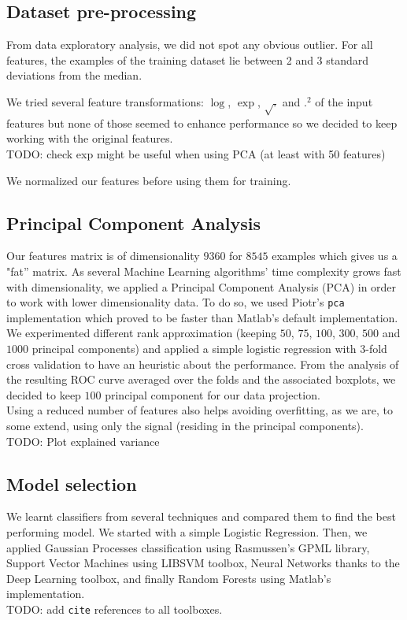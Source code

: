 \documentclass{article}
\begin{document}
  \subsection{Dataset pre-processing}
  From data exploratory analysis, we did not spot any obvious outlier. For all features, the examples of the training dataset lie between 2 and 3 standard deviations from the median.

  We tried several feature transformations: $\log$, $\exp$, $\sqrt{.}$ and $.^2$ of the input features but none of those seemed to enhance performance so we decided to keep working with the original features.\\
  TODO: check exp might be useful when using PCA (at least with 50 features)

  We normalized our features before using them for training.

  \subsection{Principal Component Analysis}
  Our features matrix is of dimensionality $9360$ for $8545$ examples which gives us a "fat'' matrix. As several Machine Learning algorithms' time complexity grows fast with dimensionality, we applied a Principal Component Analysis (PCA) in order to work with lower dimensionality data. To do so, we used Piotr's \texttt{pca} implementation which proved to be faster than Matlab's default implementation. We experimented different rank approximation (keeping $50$, $75$, $100$, $300$, $500$ and $1000$ principal components) and applied a simple logistic regression with 3-fold cross validation to have an heuristic about the performance. From the analysis of the resulting ROC curve averaged over the folds and the associated boxplots, we decided to keep $100$ principal component for our data projection. \\
  Using a reduced number of features also helps avoiding overfitting, as we are, to some extend, using only the signal (residing in the principal components).\\
    TODO: Plot explained variance

  \subsection{Model selection}
  We learnt classifiers from several techniques and compared them to find the best performing model. We started with a simple Logistic Regression. Then, we applied Gaussian Processes classification using Rasmussen's GPML library, Support Vector Machines using LIBSVM toolbox, Neural Networks thanks to the Deep Learning toolbox, and finally Random Forests using Matlab's implementation.\\
  TODO: add \texttt{cite} references to all toolboxes.
\end{document}
